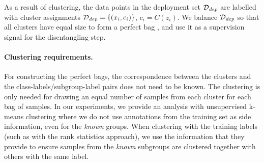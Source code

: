 As a result of clustering, the data points in the deployment set ${\mathcal{D}}_\mathit{dep}$ are labelled with cluster assignments 
${\mathcal{D}}_\mathit{dep}=\{(x_i, c_i)\}$, $c_i = C(z_i)$.
%
We balance ${\mathcal{D}}_\mathit{dep}$ so that all clusters have equal size to form a perfect bag
, and use it as a supervision signal for the disentangling step.
%

\paragraph{Clustering requirements.}
For constructing the perfect bags, the correspondence between the clusters and the class-labels/subgroup-label pairs does not need to be known.
The clustering is only needed for drawing an equal number of samples from each cluster for each bag of samples.
In our experiments, we provide an analysis with unsupervised k-means clustering where we do not use annotations from the training set as side information, even for the \emph{known} groups. 
When clustering with the training labels (such as with the rank statistics approach), we use the information that they provide to ensure samples from the \emph{known} subgroups are clustered together with others with the same label.

